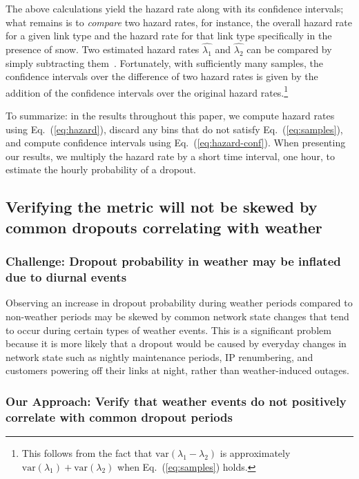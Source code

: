 The above calculations yield the hazard rate along with its confidence
intervals; what remains is to \emph{compare} two hazard rates, for
instance, the overall hazard rate for a given link type and the hazard
rate for that link type specifically in the presence of snow.
%
Two estimated hazard rates $\widehat{\lambda_1}$ and
$\widehat{\lambda_2}$ can be compared by simply subtracting
them~\cite{biostats-book}.
%
Fortunately, with sufficiently many samples, the confidence intervals
over the difference of two hazard rates is given by the addition of the
confidence intervals over the original hazard rates.\footnote{This
follows from the fact that $\mbox{var}(\lambda_1 - \lambda_2)$ is
approximately $\mbox{var}(\lambda_1) + \mbox{var}(\lambda_2)$ when
Eq.~(\ref{eq:samples}) holds.}


To summarize: in the results throughout this paper, we compute hazard
rates using Eq.~(\ref{eq:hazard}), discard any bins that do not satisfy
Eq.~(\ref{eq:samples}), and compute confidence intervals using
Eq.~(\ref{eq:hazard-conf}).
%
When presenting our results, we multiply the hazard rate by a short
time interval, one hour, to estimate the hourly probability of a
dropout.



\subsection{Verifying the metric will not be skewed by common dropouts correlating with weather} %
\label{subsec:independence_of_maintenance}

\subsubsection*{Challenge: Dropout probability in weather may be inflated due
to diurnal events}
%
Observing an increase in dropout probability during weather periods compared to
non-weather periods may be skewed by common network state changes that tend to
occur during certain types of weather events.
%
This is a significant problem because it is more likely that a dropout would be
caused by everyday changes in network state such as nightly maintenance
periods, IP renumbering, and customers powering off their links at night,
rather than weather-induced outages.

\subsubsection*{Our Approach: Verify that weather events do not positively correlate with common dropout periods}

